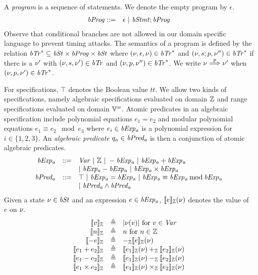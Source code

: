 A \emph{program} is a sequence of statements.
We denote the empty program by $\epsilon$.
\begin{eqnarray*}
  \mathit{bProg} & ::= & \epsilon \ |\ \mathit{bStmt}; \mathit{bProg}
\end{eqnarray*}
Observe that conditional branches are not allowed in our domain specific language to prevent timing attacks.
The semantics of a program is defined by the relation $\mathit{bTr}^* \subseteq \mathit{bSt} \times \mathit{bProg} \times \mathit{bSt}$ where $(\nu, \epsilon, \nu) \in \mathit{bTr}^*$ and $(\nu, s; p, \nu'') \in \mathit{bTr}^*$ if there is a $\nu'$ with $(\nu, s, \nu') \in \mathit{bTr}$ and $(\nu, p, \nu'') \in \mathit{bTr}^*$.
We write $\nu \overset{p}{\Longrightarrow} \nu'$ when $(\nu, p, \nu') \in \mathit{bTr}^*$.

For specifications, $\top$ denotes the Boolean value $\mathit{tt}$.
We allow two kinds of specifications, namely algebraic specifications evaluated on domain $\mathbb{Z}$ and range specifications evaluated on domain $\mathbb{V}^{\mathit{w}}$.
Atomic predicates in an algebraic specification include polynomial equations $e_1 = e_2$ and modular polynomial equations $e_1 \equiv e_2 \mod e_3$ where $e_i \in \mathit{bExp_a}$ is a polynomial expression for $i \in \{1, 2, 3\}$.
An \emph{algebraic predicate} $q_a \in \mathit{bPred_a}$ is then a conjunction of atomic algebraic predicates.
\[
\begin{array}{rcl}
  \mathit{bExp_a} & ::= & \mathit{Var} \ |\ \mathbb{Z} \ |\ - \mathit{bExp_a} \ |\ \mathit{bExp_a} + \mathit{bExp_a} \\
          &     & |\ \mathit{bExp_a} - \mathit{bExp_a} \ |\ \mathit{bExp_a} \times \mathit{bExp_a} \\
  \mathit{bPred_a} & ::= & \top \ |\ \mathit{bExp_a} = \mathit{bExp_a}\ |\ \mathit{bExp_a} \equiv \mathit{bExp_a} \mathbin{\textmd{mod}} \mathit{bExp_a} \\
           &     & |\ \mathit{bPred_a} \wedge \mathit{bPred_a} \\
\end{array}
\]
Given a state $\nu \in \mathit{bSt}$ and an expression $e \in \mathit{bExp_a}$, $[\![{e}]\!]_{\mathbb{Z}}(\nu)$ denotes the value of $e$ on $\nu$.
\[
\begin{array}{rcl}
  \zvalueof{v} & \defn & \unsigned{\bvst(v)} \textmd{ for $v \in \Var$} \\
  \zvalueof{n} & \defn & n \textmd{ for $n \in \bbfZ$} \\
  \zvalueof{- e} & \defn & -_\bbfZ \zvalueof{e}(\bvst) \\
  \zvalueof{e_1 + e_2} & \defn & \zvalueof{e_1}(\bvst) +_\bbfZ \zvalueof{e_2}(\bvst) \\
  \zvalueof{e_1 - e_2} & \defn & \zvalueof{e_1}(\bvst) -_\bbfZ \zvalueof{e_2}(\bvst) \\
  \zvalueof{e_1 \times e_2} & \defn & \zvalueof{e_1}(\bvst) \times_\bbfZ \zvalueof{e_2}(\bvst) \\
\end{array}
\]
